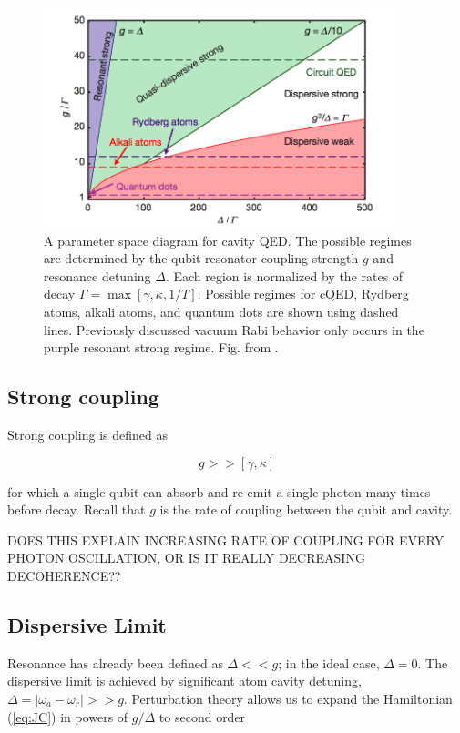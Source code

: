 \documentclass[11 pt, oneside]{book} %
\begin{document}
\begin{figure}[h] 
   \centering
   \includegraphics[width=4in]{HouckParameterSpace.png} 
   \caption[Parameter space diagram for cavity QED]{A parameter space diagram for cavity QED. The possible regimes are determined by the qubit-resonator coupling strength $g$ and resonance detuning $\Delta$. Each region is normalized by the rates of decay $\Gamma=\max[\gamma,\kappa,1/T]$. Possible regimes for cQED, Rydberg atoms, alkali atoms, and quantum dots are shown using dashed lines. Previously discussed vacuum Rabi behavior only occurs in the purple resonant strong regime. Fig. from \cite{SchusterResolving}.}
   \label{fig:Regimes}
\end{figure}

\subsection{Strong coupling}\label{sec:StrongCoupling}
Strong coupling is defined as 

\begin{equation}
g>>[\gamma, \kappa]
\end{equation}

for which a single qubit can absorb and re-emit a single photon many times before decay. Recall that $g$ is the rate of coupling between the qubit and cavity. 

DOES THIS EXPLAIN INCREASING RATE OF COUPLING FOR EVERY PHOTON OSCILLATION, OR IS IT REALLY DECREASING DECOHERENCE??


\subsection{Dispersive Limit}
Resonance has already been defined as $\Delta << g$; in the ideal case, $\Delta=0$. The dispersive limit is achieved by significant atom cavity detuning, $\Delta=|\omega_a-\omega_r| >> g$. Perturbation theory allows us to expand the Hamiltonian (\ref{eq:JC}) in powers of $g/\Delta$ to second order
\end{document}
